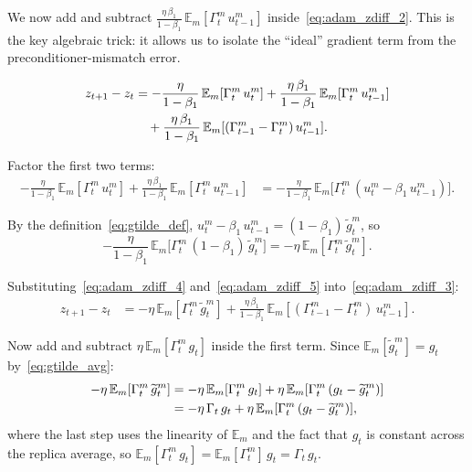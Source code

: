 \documentclass{article}
\begin{document}
We now add and subtract
$\frac{\eta\,\beta_1}{1-\beta_1}\,\mathbb{E}_m[\Gamma_t^m\,u_{t-1}^m]$
inside~\eqref{eq:adam_zdiff_2}. This is the key algebraic trick: it allows us
to isolate the ``ideal'' gradient term from the preconditioner-mismatch error.

\begin{align}
z_{t+1} - z_t
&= -\frac{\eta}{1-\beta_1}\,\mathbb{E}_m[\Gamma_t^m\,u_t^m]
   + \frac{\eta\,\beta_1}{1-\beta_1}\,\mathbb{E}_m[\Gamma_t^m\,u_{t-1}^m]
   \notag \\
&\quad+ \frac{\eta\,\beta_1}{1-\beta_1}\,
   \mathbb{E}_m[(\Gamma_{t-1}^m - \Gamma_t^m)\,u_{t-1}^m].
\label{eq:adam_zdiff_3}
\end{align}

Factor the first two terms:
\begin{align}
-\frac{\eta}{1-\beta_1}\,\mathbb{E}_m[\Gamma_t^m\,u_t^m]
+ \frac{\eta\,\beta_1}{1-\beta_1}\,\mathbb{E}_m[\Gamma_t^m\,u_{t-1}^m]
&= -\frac{\eta}{1-\beta_1}\,
   \mathbb{E}_m\bigl[\Gamma_t^m\,(u_t^m - \beta_1\,u_{t-1}^m)\bigr].
\label{eq:adam_zdiff_4}
\end{align}

By the definition~\eqref{eq:gtilde_def},
$u_t^m - \beta_1\,u_{t-1}^m = (1-\beta_1)\,\widetilde{g}_t^m$, so
\begin{equation}
-\frac{\eta}{1-\beta_1}\,
\mathbb{E}_m\bigl[\Gamma_t^m\,(1-\beta_1)\,\widetilde{g}_t^m\bigr]
= -\eta\,\mathbb{E}_m[\Gamma_t^m\,\widetilde{g}_t^m].
\label{eq:adam_zdiff_5}
\end{equation}

Substituting~\eqref{eq:adam_zdiff_4} and~\eqref{eq:adam_zdiff_5}
into~\eqref{eq:adam_zdiff_3}:
\begin{align}
z_{t+1} - z_t
&= -\eta\,\mathbb{E}_m[\Gamma_t^m\,\widetilde{g}_t^m]
   + \frac{\eta\,\beta_1}{1-\beta_1}\,
   \mathbb{E}_m[(\Gamma_{t-1}^m - \Gamma_t^m)\,u_{t-1}^m].
\label{eq:adam_zdiff_6}
\end{align}

Now add and subtract $\eta\,\mathbb{E}_m[\Gamma_t^m\,g_t]$ inside the first
term. Since $\mathbb{E}_m[\widetilde{g}_t^m] = g_t$
by~\eqref{eq:gtilde_avg}:
\begin{align}
-\eta\,\mathbb{E}_m[\Gamma_t^m\,\widetilde{g}_t^m]
&= -\eta\,\mathbb{E}_m[\Gamma_t^m\,g_t]
   + \eta\,\mathbb{E}_m[\Gamma_t^m\,(g_t - \widetilde{g}_t^m)] \notag \\
&= -\eta\,\Gamma_t\,g_t
   + \eta\,\mathbb{E}_m[\Gamma_t^m\,(g_t - \widetilde{g}_t^m)],
\label{eq:adam_zdiff_7}
\end{align}
where the last step uses the linearity of $\mathbb{E}_m$ and the fact that
$g_t$ is constant across the replica average, so
$\mathbb{E}_m[\Gamma_t^m\,g_t] = \mathbb{E}_m[\Gamma_t^m]\,g_t = \Gamma_t\,g_t$.
\end{document}
